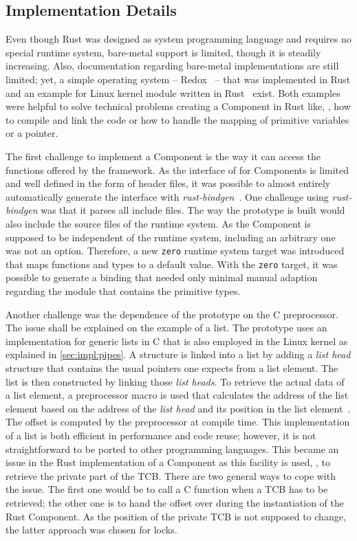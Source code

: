 \subsection{Implementation Details}%
\label{sec:study:rust:impl}

Even though Rust was designed as system programming language and requires no special runtime system, bare-metal support is limited, though it is steadily increasing. Also, documentation regarding bare-metal implementations are still limited; yet, a simple operating system -- Redox~\cite{Redox} -- that was implemented in Rust and an example for Linux kernel module written in Rust~\cite{rust_ko} exist. Both examples were helpful to solve technical problems creating a \cobas{} Component in Rust like, \eg{}, how to compile and link the code or how to handle the mapping of primitive variables or a  pointer.

The first challenge to implement a Component is the way it can access the functions offered by the framework. As the interface of \cobas{} for Components is limited and well defined in the form of header files, it was possible to almost entirely automatically generate the interface with \emph{rust-bindgen}~\cite{rust-bindgen}. One challenge using \emph{rust-bindgen} was that it parses all include files. The way the \cobas{} prototype is built would also include the source files of the runtime system. As the Component is supposed to be independent of the runtime system, including an arbitrary one was not an option. Therefore, a new \texttt{zero} runtime system target was introduced that maps functions and types to a default value. With the \texttt{zero} target, it was possible to generate a binding that needed only minimal manual adaption regarding the module that contains the primitive types.

Another challenge was the dependence of the \cobas{} prototype on the C preprocessor. The issue shall be explained on the example of a list. The \cobas{} prototype uses an implementation for generic lists in C that is also employed in the Linux kernel as explained in \cref{sec:impl:pipes}. A structure is linked into a list by adding a \emph{list head} structure that contains the usual pointers one expects from a list element. The list is then constructed by linking those \emph{list heads}. To retrieve the actual data of a list element, a preprocessor macro is used that calculates the address of the list element based on the address of the \emph{list head} and its position in the list element~\cite[\cf{}][87--89]{Bovet-2005-LinuxKernel}. The offset is computed by the preprocessor at compile time. This implementation of a list is both efficient in performance and code reuse; however, it is not straightforward to be ported to other programming languages. This became an issue in the Rust implementation of a \cobas{} Component as this facility is used, \eg{}, to retrieve the private part of the \ac{TCB}. There are two general ways to cope with the issue. The first one would be to call a C function when a \ac{TCB} has to be retrieved; the other one is to hand the offset over during the instantiation of the Rust Component. As the position of the private \ac{TCB} is not supposed to change, the latter approach was chosen for locks.


